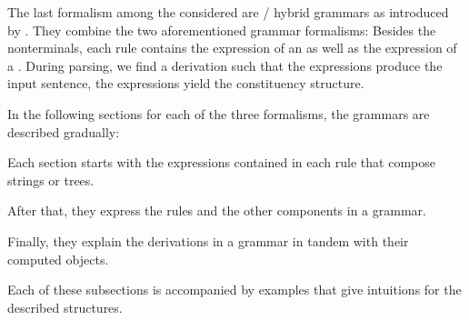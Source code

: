 \documentclass[../document.tex]{subfiles}
\begin{document}
    The last formalism among the considered are / hybrid grammars as introduced by \citet{Ned14}.
    They combine the two aforementioned grammar formalisms:
        Besides the nonterminals, each rule contains the expression of an  as well as the expression of a .
    During parsing, we find a derivation such that the  expressions produce the input sentence, the  expressions yield the constituency structure.

    In the following sections for each of the three formalisms, the grammars are described gradually:
    \begin{inparaenum}
        \item Each section starts with the expressions contained in each rule that compose strings or trees.
        \item After that, they express the rules and the other components in a grammar.
        \item Finally, they explain the derivations in a grammar in tandem with their computed objects.
    \end{inparaenum}
    Each of these subsections is accompanied by examples that give intuitions for the described structures.

    
    
    

    \ifSubfilesClassLoaded{%
        \printindex
    }{}
\end{document}
